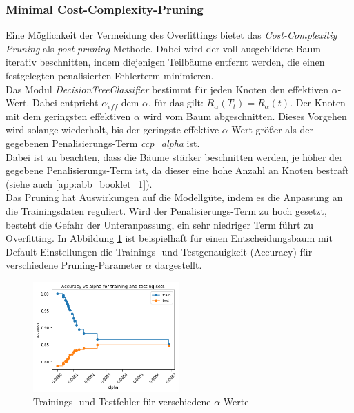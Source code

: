 \subsubsection{Minimal Cost-Complexity-Pruning}
Eine Möglichkeit der Vermeidung des Overfittings bietet das \emph{Cost-Complexitiy Pruning} als \emph{post-pruning} Methode. Dabei wird der voll ausgebildete Baum iterativ beschnitten, indem diejenigen Teilbäume entfernt werden, die einen festgelegten penalisierten Fehlerterm minimieren.\\
\noindent \hspace*{7mm}
Das Modul \emph{DecisionTreeClassifier} bestimmt für jeden Knoten den effektiven $\alpha$-Wert. Dabei entpricht $\alpha_{eff}$ dem $\alpha$, für das gilt: $R_{\alpha}(T_{t})=R_{\alpha}(t)$. Der Knoten mit dem geringsten effektiven $\alpha$ wird vom Baum abgeschnitten. Dieses Vorgehen wird solange wiederholt, bis der geringste effektive $\alpha$-Wert größer als der gegebenen Penalisierungs-Term \emph{ccp\_alpha} ist.\\
\noindent \hspace*{7mm}
Dabei ist zu beachten, dass die Bäume stärker beschnitten werden, je höher der gegebene Penalisierungs-Term ist, da dieser eine hohe Anzahl an Knoten bestraft (siehe auch \ref{app:abb_booklet_1}).\\
\noindent \hspace*{7mm}
Das Pruning hat Auswirkungen auf die Modellgüte, indem es die Anpassung an die Trainingsdaten reguliert. Wird der Penalisierungs-Term zu hoch gesetzt, besteht die Gefahr der Unteranpassung, ein sehr niedriger Term führt zu Overfitting. In Abbildung \ref{fig:ccp_accuracyVsAlpha} ist beispielhaft für einen Entscheidungsbaum mit Default-Einstellungen die Trainings- und Testgenauigkeit (Accuracy) für verschiedene Pruning-Parameter $\alpha$ dargestellt.
\begin{figure}[h]
	\centering
	\includegraphics[width = 0.5\textwidth]{Bilder/ccp_accuracyVsAlpha.png}
	\caption{Trainings- und Testfehler für verschiedene $\alpha$-Werte}
	\label{fig:ccp_accuracyVsAlpha}
\end{figure}



